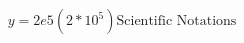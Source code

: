 \documentclass[preview]{standalone}
\begin{document}
\begin{align*}
y = 2e5 (2 * 10^5) \text{Scientific Notations}
\end{align*}
\end{document}
